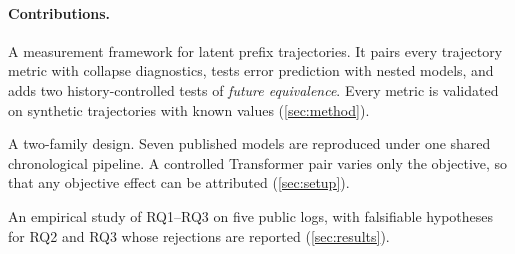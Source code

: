 \paragraph{Contributions.}
\begin{enumerate*}[label=(\arabic*)]
\item A measurement framework for latent prefix trajectories. It pairs every
      trajectory metric with collapse diagnostics, tests error prediction with
      nested models, and adds two history-controlled tests of \emph{future
      equivalence}. Every metric is validated on synthetic trajectories with
      known values (\cref{sec:method}).
\item A two-family design. Seven published models are reproduced under one
      shared chronological pipeline. A controlled Transformer pair varies only
      the objective, so that any objective effect can be attributed
      (\cref{sec:setup}).
\item An empirical study of RQ1--RQ3 on five public logs, with falsifiable
      hypotheses for RQ2 and RQ3 whose rejections are reported
      (\cref{sec:results}).
\end{enumerate*}

